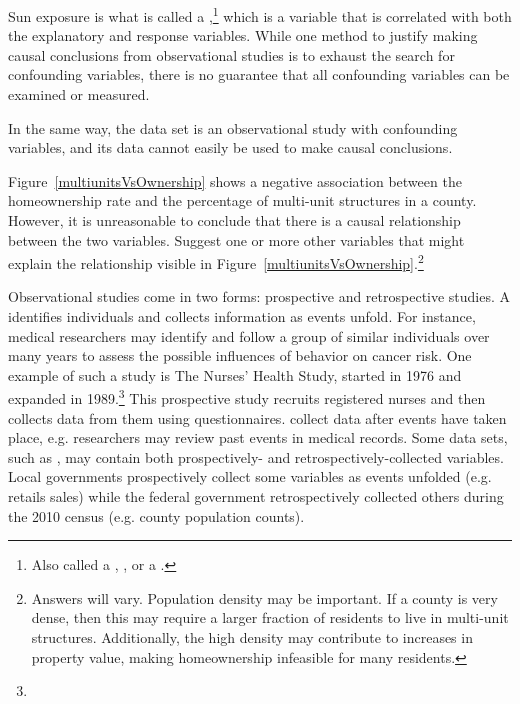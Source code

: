 Sun exposure is what is called a ,\footnote{Also called a , , or a .} which is a variable that is correlated with both the explanatory and response variables. While one method to justify making causal conclusions from observational studies is to exhaust the search for confounding variables, there is no guarantee that all confounding variables can be examined or measured.

In the same way, the  data set is an observational study with confounding variables, and its data cannot easily be used to make causal conclusions.

\begin{exercise}
Figure~\ref{multiunitsVsOwnership} shows a negative association between the homeownership rate and the percentage of multi-unit structures in a county. However, it is unreasonable to conclude that there is a causal relationship between the two variables. Suggest one or more other variables that might explain the relationship visible in Figure~\ref{multiunitsVsOwnership}.\footnote{Answers will vary. Population density may be important. If a county is very dense, then this may require a larger fraction of residents to live in multi-unit structures. Additionally, the high density may contribute to increases in property value, making homeownership infeasible for many residents.}
\end{exercise}

Observational studies come in two forms: prospective and retrospective studies. A  identifies individuals and collects information as events unfold. For instance, medical researchers may identify and follow a group of similar individuals over many years to assess the possible influences of behavior on cancer risk. One example of such a study is The Nurses' Health Study, started in 1976 and expanded in 1989.\footnote{} This prospective study recruits registered nurses and then collects data from them using questionnaires.  collect data after events have taken place, e.g. researchers may review past events in medical records. Some data sets, such as , may contain both prospectively- and retrospectively-collected variables. Local governments prospectively collect some variables as events unfolded (e.g. retails sales) while the federal government retrospectively collected others during the 2010 census (e.g. county population counts).

